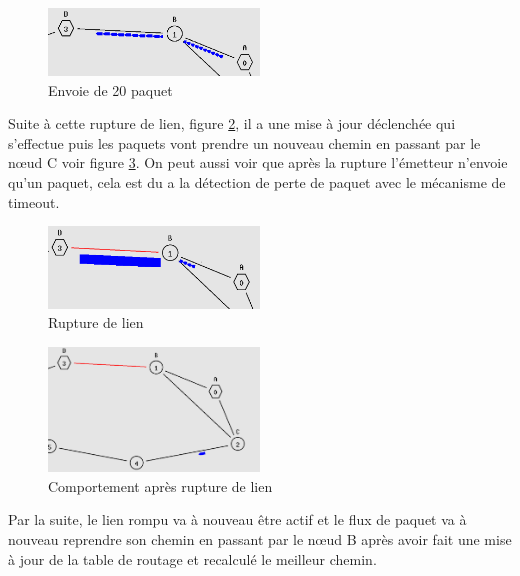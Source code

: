 \documentclass[11pt]{article}
\begin{document}
\begin{figure}[H]
	\begin{center}
		\includegraphics[width=0.5\textwidth]{assets/tp2/envoie20paquet.png}
	\end{center}
	\caption{Envoie de 20 paquet}
	\label{envoie20}
\end{figure}


Suite à cette rupture de lien, figure \ref{rupturelienT}, il a une mise à jour déclenchée qui s’effectue puis les paquets vont prendre un nouveau chemin en passant par le nœud C voir figure \ref{nouveauchemain}. On peut aussi voir que après la rupture l’émetteur n'envoie qu'un paquet, cela est du a la détection de perte de paquet avec le mécanisme de timeout.

\begin{figure}[H]
	\begin{center}
		\includegraphics[width=0.5\textwidth]{assets/tp2/ruptureLien.png}
	\end{center}
	\caption{Rupture de lien}
	\label{rupturelienT}
\end{figure}

\begin{figure}[H]
	\begin{center}
		\includegraphics[width=0.5\textwidth]{assets/tp2/Nouveauchemain.png}
	\end{center}
	\caption{Comportement après rupture de lien}
	\label{nouveauchemain}
\end{figure}

Par la suite, le lien rompu va à nouveau être actif et le flux de paquet va à nouveau reprendre son chemin en passant par le nœud B après avoir fait une mise à jour de la table de routage et recalculé le meilleur chemin.\\
\end{document}

